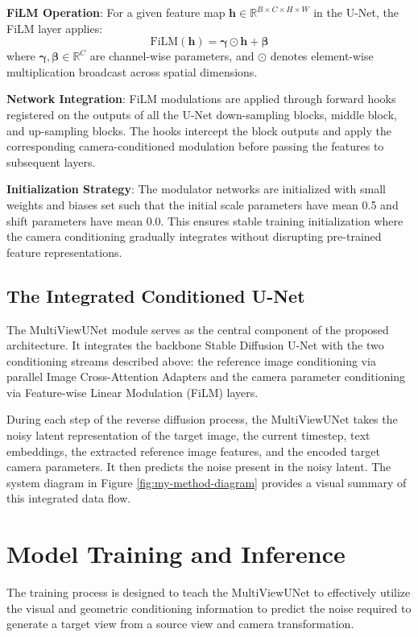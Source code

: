 \textbf{FiLM Operation}: For a given feature map $\mathbf{h} \in \mathbb{R}^{B \times C \times H \times W}$ in the U-Net, the FiLM layer applies:
\[ \text{FiLM}(\mathbf{h}) = \boldsymbol{\gamma} \odot \mathbf{h} + \boldsymbol{\beta} \]
where $\boldsymbol{\gamma}, \boldsymbol{\beta} \in \mathbb{R}^C$ are channel-wise parameters, and $\odot$ denotes element-wise multiplication broadcast across spatial dimensions.

\textbf{Network Integration}: FiLM modulations are applied through forward hooks registered on the outputs of all the U-Net down-sampling blocks, middle block, and up-sampling blocks. The hooks intercept the block outputs and apply the corresponding camera-conditioned modulation before passing the features to subsequent layers.

\textbf{Initialization Strategy}: The modulator networks are initialized with small weights and biases set such that the initial scale parameters have mean 0.5 and shift parameters have mean 0.0. This ensures stable training initialization where the camera conditioning gradually integrates without disrupting pre-trained feature representations.

\subsection{The Integrated Conditioned U-Net}
The $\text{MultiViewUNet}$ module serves as the central component of the proposed architecture. It integrates the backbone Stable Diffusion U-Net with the two conditioning streams described above: the reference image conditioning via parallel Image Cross-Attention Adapters and the camera parameter conditioning via Feature-wise Linear Modulation (FiLM) layers.

During each step of the reverse diffusion process, the $\text{MultiViewUNet}$ takes the noisy latent representation of the target image, the current timestep, text embeddings, the extracted reference image features, and the encoded target camera parameters. It then predicts the noise present in the noisy latent. The system diagram in Figure \ref{fig:my-method-diagram} provides a visual summary of this integrated data flow.

\section{Model Training and Inference}
The training process is designed to teach the $\text{MultiViewUNet}$ to effectively utilize the visual and geometric conditioning information to predict the noise required to generate a target view from a source view and camera transformation.

